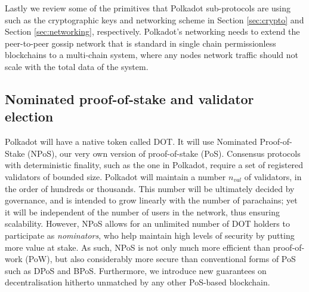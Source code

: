 \documentclass{article}
\newcommand{\nval}{\ensuremath{n_{val}}} %
\begin{document}
Lastly we review 
some of the primitives that Polkadot sub-protocols are using such as the cryptographic keys and networking scheme in Section \ref{sec:crypto} and Section \ref{sec:networking}, respectively. Polkadot's networking needs to extend the peer-to-peer gossip network that is standard in single chain permissionless blockchains to a multi-chain system, where any nodes network traffic should not scale with the total data of the system.%








\subsection{Nominated proof-of-stake and validator election}\label{sec:validators}
Polkadot will have a native token called DOT. It will use Nominated Proof-of-Stake (NPoS), our very own version of proof-of-stake (PoS).
Consensus protocols with deterministic finality, such as the one in Polkadot, 
require a set of registered validators of bounded size.
Polkadot will maintain a number $\nval$ of validators, in the order of hundreds or thousands.
This number will be ultimately decided by governance, and is intended to grow linearly with the number of parachains;
yet it will be independent of the number of users in the network, thus ensuring scalability.
However, NPoS allows for an unlimited number of DOT holders to participate as \emph{nominators},
who help maintain high levels of security by putting more value at stake.
As such, NPoS is not only much more efficient than proof-of-work (PoW),
but also considerably more secure than conventional forms of PoS such as DPoS and BPoS. %
Furthermore, we introduce new guarantees on decentralisation hitherto unmatched by any other PoS-based blockchain.
\end{document}
